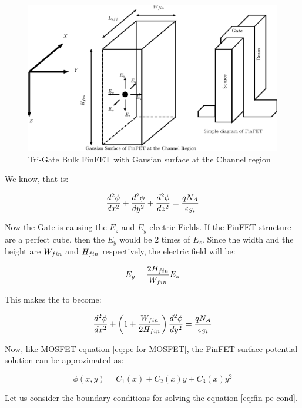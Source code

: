\documentclass[a4paper]{article}
\begin{document}
\begin{figure}[!h]
  \includegraphics[scale=0.8]{./FinFET-E-Field.eps}
  \caption{Tri-Gate Bulk FinFET with Gausian surface at the Channel region}
  \label{fig:FinFET-E-Field}
\end{figure}

We know, that \PE is:

\begin{equation}
  \frac {d^2\phi} {dx^2} + \frac {d^2\phi} {dy^2} + \frac {d^2\phi} {dz^2} = \frac{qN_A} {\epsilon_{Si}}
\end{equation}

Now the Gate is causing the $E_z$ and $E_y$ electric Fields. If the FinFET structure are a perfect cube, then the $E_y$ would be 2 times of $E_z$. Since the width and the height are $W_{fin}$ and $H_{fin}$ respectively, the electric field will be:

\begin{align*}
  E_y = \frac{2H_{fin}}{W_{fin}} E_z
\end{align*}

This makes the \PE to become:

\begin{equation}
  \label{eq:pe-finFET}
  \frac {d^2\phi} {dx^2} + \left( 1 + \frac{W_{fin}}{2 H_{fin}} \right) \frac {d^2\phi} {dy^2} = \frac{qN_A} {\epsilon_{Si}}
\end{equation}

Now, like MOSFET equation \ref{eq:pe-for-MOSFET}, the FinFET surface potential solution can be approzimated as:

\begin{equation}
  \label{eq:fin-pe-cond}
  \phi(x,y) = C_1(x) + C_2(x)y  + C_3(x)y^2
\end{equation}

Let us consider the boundary conditions for solving the equation \ref{eq:fin-pe-cond}.
\end{document}
